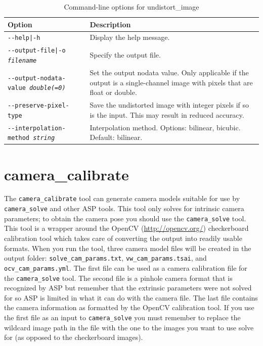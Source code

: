 \begin{longtable}{|l|p{7.5cm}|}
\caption{Command-line options for undistort\_image}
\label{tbl:undistortimage}
\endfirsthead
\endhead
\endfoot
\endlastfoot
\hline
Option & Description \\ \hline \hline
\texttt{-\/-help|-h} & Display the help message. \\ \hline
\texttt{-\/-output-file|-o \textit{filename}} & Specify the output file. \\ \hline
\texttt{-\/-output-nodata-value \textit{double(=0)}} & 
Set the output nodata value. Only applicable if the output is a single-channel 
image with pixels that are float or double.  \\ \hline

\texttt{-\/-preserve-pixel-type} & 
Save the undistorted image with integer pixels if so is the input. This may 
result in reduced accuracy.
\\ \hline

\texttt{-\/-interpolation-method \textit{string}} & 
Interpolation method. Options: bilinear, bicubic. Default: bilinear. 
\\ \hline

\end{longtable}

\section{camera\_calibrate}
\label{cameracalibrate}

The \texttt{camera\_calibrate} tool can generate camera models suitable for use by \texttt{camera\_solve}
and other ASP tools.  This tool only solves for intrinsic camera parameters; to obtain the camera pose you
should  use the \texttt{camera\_solve} tool.  This tool is a wrapper around the OpenCV (\url{http://opencv.org/})
checkerboard calibration tool which takes care of converting the output into readily usable formats.  When you
run the tool, three camera model files will be created in the output folder:
\texttt{solve\_cam\_params.txt}, \texttt{vw\_cam\_params.tsai}, and \texttt{ocv\_cam\_params.yml}.
The first file can be used as a camera calibration file for the \texttt{camera\_solve} tool.  The second file
is a pinhole camera format that is recognized by ASP but remember that the extrinsic parameters were not solved
for so ASP is limited in what it can do with the camera file.  The last file contains the camera information as
formatted by the OpenCV calibration tool.  If you use the first file as an input to \texttt{camera\_solve}
you must remember to replace the wildcard image path in the file with the one to the images you want to use
solve for (as opposed to the checkerboard images).

